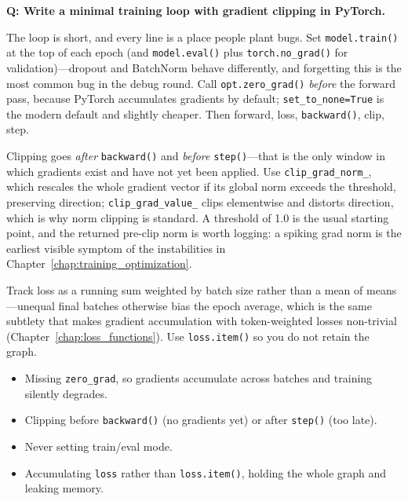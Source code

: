 \begin{interviewq}
\textbf{Q: Write a minimal training loop with gradient clipping in PyTorch.}

 \quad {} \quad \badgefreq{\freqhigh}

\stronganswer

The loop is short, and every line is a place people plant bugs. Set \texttt{model.train()} at the top of each epoch (and \texttt{model.eval()} plus \texttt{torch.no\_grad()} for validation)---dropout and BatchNorm behave differently, and forgetting this is the most common bug in the debug round. Call \texttt{opt.zero\_grad()} \emph{before} the forward pass, because PyTorch accumulates gradients by default; \texttt{set\_to\_none=True} is the modern default and slightly cheaper. Then forward, loss, \texttt{backward()}, clip, step.

Clipping goes \emph{after} \texttt{backward()} and \emph{before} \texttt{step()}---that is the only window in which gradients exist and have not yet been applied. Use \texttt{clip\_grad\_norm\_}, which rescales the whole gradient vector if its global norm exceeds the threshold, preserving direction; \texttt{clip\_grad\_value\_} clips elementwise and distorts direction, which is why norm clipping is standard. A threshold of 1.0 is the usual starting point, and the returned pre-clip norm is worth logging: a spiking grad norm is the earliest visible symptom of the instabilities in Chapter~\ref{chap:training_optimization}.

Track loss as a running sum weighted by batch size rather than a mean of means---unequal final batches otherwise bias the epoch average, which is the same subtlety that makes gradient accumulation with token-weighted losses non-trivial (Chapter~\ref{chap:loss_functions}). Use \texttt{loss.item()} so you do not retain the graph.

\redflags
\begin{itemize}
    \item Missing \texttt{zero\_grad}, so gradients accumulate across batches and training silently degrades.
    \item Clipping before \texttt{backward()} (no gradients yet) or after \texttt{step()} (too late).
    \item Never setting train/eval mode.
    \item Accumulating \texttt{loss} rather than \texttt{loss.item()}, holding the whole graph and leaking memory.
\end{itemize}


\end{interviewq}
